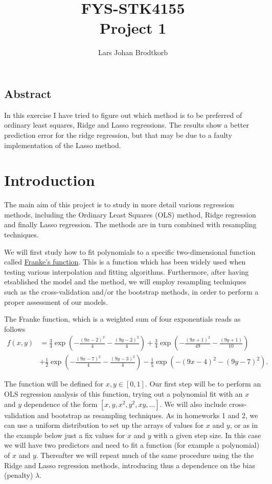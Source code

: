 \title{FYS-STK4155 \\
Project 1}
\author{Lars Johan Brodtkorb}
\date{ }

\subsection*{Abstract}

In this exercise I have tried to figure out which method is to be preferred of ordinary least squares, Ridge and Lasso regressions. The results show a better prediction error for the ridge regression, but that may be due to a faulty implementation of the Lasso method. 

\section{Introduction}

The main aim of this project is to study in more detail various
regression methods, including the Ordinary Least Squares (OLS) method,
Ridge regression and finally Lasso regression.
The methods are in turn combined with resampling techniques.

We will first study how
to fit polynomials to a specific two-dimensional function called
\href{{http://www.dtic.mil/dtic/tr/fulltext/u2/a081688.pdf}}{Franke's
	function}.  This
is a function which has been widely used when testing various  interpolation and fitting
algorithms. Furthermore, after having etsablished the model and the
method, we will employ resampling techniques such as the  cross-validation and/or
the bootstrap methods, in order to perform a proper assessment of our models.


The Franke function, which is a weighted sum of four exponentials  reads as follows
\begin{align*}
f(x,y) &= \frac{3}{4}\exp{\left(-\frac{(9x-2)^2}{4} - \frac{(9y-2)^2}{4}\right)}+\frac{3}{4}\exp{\left(-\frac{(9x+1)^2}{49}- \frac{(9y+1)}{10}\right)} \\
&+\frac{1}{2}\exp{\left(-\frac{(9x-7)^2}{4} - \frac{(9y-3)^2}{4}\right)} -\frac{1}{5}\exp{\left(-(9x-4)^2 - (9y-7)^2\right) }.
\end{align*}

The function will be defined for $x,y\in [0,1]$.  Our first step will
be to perform an OLS regression analysis of this function, trying out
a polynomial fit with an $x$ and $y$ dependence of the form $[x, y,
x^2, y^2, xy, \dots]$. We will also include cross-validation and
bootstrap as resampling techniques.  As in homeworks 1 and 2, we
can use a uniform distribution to set up the arrays of values for $x$
and $y$, or as in the example below just a fix values for $x$ and $y$ with a given step size.
In this case we will have two predictors and need to fit a
function (for example a polynomial) of $x$ and $y$.  Thereafter we will
repeat much of the same procedure using the the Ridge and
Lasso regression methods, introducing thus a dependence on the bias
(penalty) $\lambda$.

